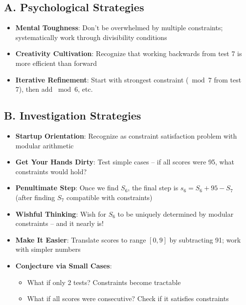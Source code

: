 \documentclass[11pt]{article}
\begin{document}
\begin{strategicbox}
\subsection*{A. Psychological Strategies}
\begin{itemize}[leftmargin=*]
    \item \textbf{Mental Toughness}: Don't be overwhelmed by multiple constraints; systematically work through divisibility conditions
    
    \item \textbf{Creativity Cultivation}: Recognize that working backwards from test 7 is more efficient than forward
    
    \item \textbf{Iterative Refinement}: Start with strongest constraint ($\bmod 7$ from test 7), then add $\bmod 6$, etc.
\end{itemize}

\subsection*{B. Investigation Strategies}
\begin{itemize}[leftmargin=*]
    \item \textbf{Startup Orientation}: Recognize as constraint satisfaction problem with modular arithmetic
    
    \item \textbf{Get Your Hands Dirty}: Test simple cases -- if all scores were 95, what constraints would hold?
    
    \item \textbf{Penultimate Step}: Once we find $S_6$, the final step is $s_6 = S_6 + 95 - S_7$ (after finding $S_7$ compatible with constraints)
    
    \item \textbf{Wishful Thinking}: Wish for $S_6$ to be uniquely determined by modular constraints -- and it nearly is!
    
    \item \textbf{Make It Easier}: Translate scores to range $[0, 9]$ by subtracting 91; work with simpler numbers
    
    \item \textbf{Conjecture via Small Cases}: 
    \begin{itemize}
        \item What if only 2 tests? Constraints become tractable
        \item What if all scores were consecutive? Check if it satisfies constraints
    \end{itemize}
    

\end{itemize}
\end{strategicbox}
\end{document}
